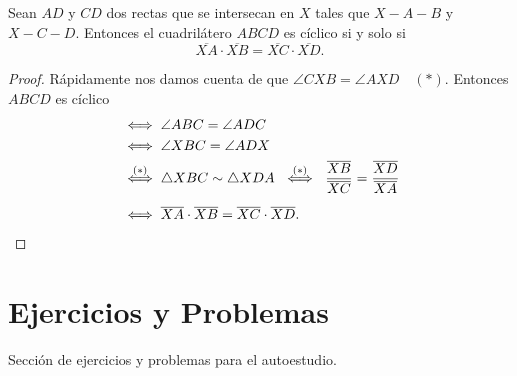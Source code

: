 \begin{section-property}\label{power-external-point}
Sean $AD$ y $CD$ dos rectas que se intersecan en $X$ tales que $X - A - B$ y $X - C - D$.
Entonces el cuadrilátero $ABCD$ es cíclico si y solo si
\[
    \overline{XA} \cdot \overline{XB} = \overline{XC} \cdot \overline{XD}.
\]\end{section-property}

\begin{multicols}{2}
    \begin{proof}
        Rápidamente nos damos cuenta de que $\angle CXB = \angle AXD\quad (\ast).$
        Entonces $ABCD$ es cíclico
        \begin{align*}
            &\iff \angle ABC = \angle ADC\\
            &\iff \angle XBC = \angle ADX\\
            &\overset{(\ast)}{\iff} \triangle XBC \sim \triangle XDA \ \overset{(\ast)}{\iff} \ \frac{\overline{XB}}{\overline{XC}} = \frac{\overline{XD}}{\overline{XA}}\\[2mm]
            &\iff \overline{XA} \cdot \overline{XB} = \overline{XC} \cdot \overline{XD}. \qedhere
        \end{align*}
    \end{proof}
    \begin{figure}[H]
        \centering
        
    \end{figure}
\end{multicols}




\section{Ejercicios y Problemas}

Sección de ejercicios y problemas para el autoestudio.
